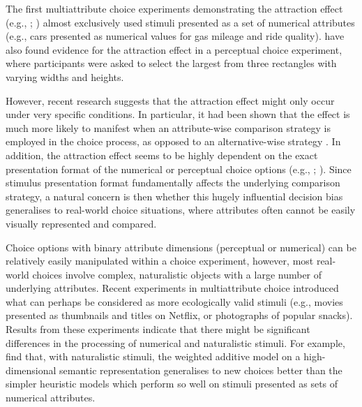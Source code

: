 \documentclass[12pt, a4paper]{article}
\begin{document}
The first multiattribute choice experiments demonstrating the attraction effect (e.g., ; ) almost exclusively used stimuli presented as a set of numerical attributes (e.g., cars presented as numerical values for gas mileage and ride quality).  have also found evidence for the attraction effect in a perceptual choice experiment, where participants were asked to select the largest from three rectangles with varying widths and heights. 


However, recent research suggests that the attraction effect might only occur under very specific conditions.
In particular, it had been shown that the effect is much more likely to manifest when an attribute-wise comparison strategy is employed in the choice process, as opposed to an alternative-wise strategy \cite{Noguchi2014a}. In addition, the attraction effect seems to be highly dependent on the exact presentation format of the numerical or perceptual choice options (e.g., ; ). Since stimulus presentation format fundamentally affects the underlying comparison strategy, a natural concern is then whether this hugely influential decision bias generalises to real-world choice situations, where attributes often cannot be easily visually represented and compared.  


Choice options with binary attribute dimensions (perceptual or numerical) can be relatively easily manipulated within a choice experiment, however, most real-world choices involve complex, naturalistic objects with a large number of underlying attributes. Recent experiments in multiattribute choice introduced what can perhaps be considered as more ecologically valid stimuli (e.g., movies presented as thumbnails and titles on Netflix, or photographs of popular snacks). Results from these experiments indicate that there might be significant differences in the processing of numerical and naturalistic stimuli. For example,  find that, with naturalistic stimuli, the weighted additive model on a high-dimensional semantic representation generalises to new choices better than the simpler heuristic models which perform so well on stimuli presented as sets of numerical attributes.
\end{document}
